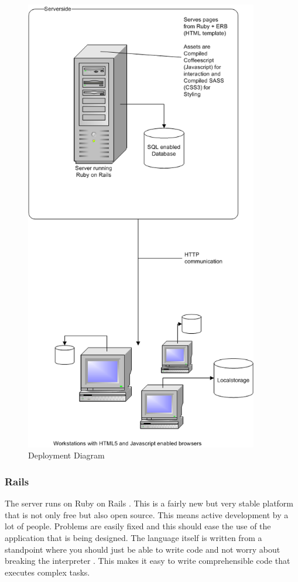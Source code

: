 \documentclass{report}
\begin{document}
				\begin{figure}[htb]
					\begin{center}
						\includegraphics[height=20cm,keepaspectratio=true]{EAD.png}
						\caption{Deployment Diagram}
						\label{fig: EAD}
					\end{center}
				\end{figure}
				\clearpage
									
				\subsubsection{Rails}
					The server runs on Ruby on Rails \cite{ror} . This is a fairly new but very stable platform that is not only free but also open source. This means active development by a lot of people. Problems are easily fixed and this should ease the use of the application that is being designed. The language itself is written from a standpoint where you should just be able to write code and not worry about breaking the interpreter \cite{ruby} . This makes it easy to write comprehensible code that executes complex tasks.				
\end{document}
